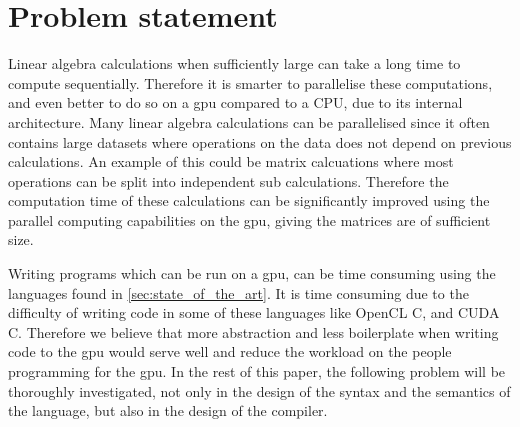 \newpage
\section{Problem statement}
\label{sec:problem}

Linear algebra calculations when sufficiently large can take a long time to compute sequentially. 
Therefore it is smarter to parallelise these computations, and even better to do so on a \acrshort{gpu} compared to a CPU, due to its internal architecture.
Many linear algebra calculations can be parallelised since it often contains large datasets where operations on the data does not depend on previous calculations.
An example of this could be matrix calcuations where most operations can be split into independent sub calculations.
Therefore the computation time of these calculations can be significantly improved using the parallel computing capabilities on the \acrshort{gpu}, giving the matrices are of sufficient size.

Writing programs which can be run on a \acrshort{gpu}, can be time consuming using the languages found in \ref{sec:state_of_the_art}.
It is time consuming due to the difficulty of writing code in some of these languages like OpenCL C, and CUDA C.
Therefore we believe that more abstraction and less boilerplate when writing code to the \acrshort{gpu} would serve well and reduce the workload on the people programming for the \acrshort{gpu}.
In the rest of this paper, the following problem will be thoroughly investigated, not only in the design of the syntax and the semantics of the language, but also in the design of the compiler.

